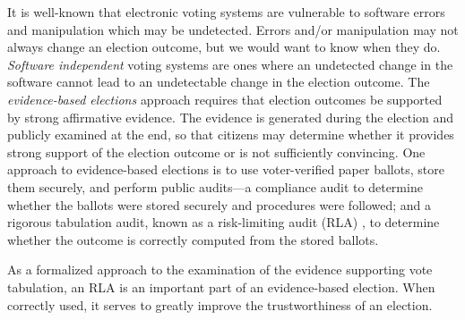 It is well-known that electronic voting systems are vulnerable to software errors and manipulation which may be undetected. Errors and/or manipulation may not always change an election outcome, but we would want to know when they do. {\em Software independent} voting systems \cite{SI-Wack,rivest2008notion} are ones where an undetected change in the software cannot lead to an undetectable change in the election outcome. The {\em evidence-based elections} \cite{evidence-based} approach requires that election outcomes be supported by strong affirmative evidence. The evidence is generated during the election and publicly examined at the end, so that citizens may determine whether it provides strong support of the election outcome or is not sufficiently convincing. 
One approach to evidence-based elections is to use voter-verified paper ballots, store them securely, and perform public audits---a compliance audit to determine whether the ballots were stored securely and procedures were followed; and a rigorous tabulation audit, known as a risk-limiting audit (RLA) \cite{RLA}, to determine whether the outcome is correctly computed from the stored ballots.  

As a formalized approach to the examination of the evidence supporting vote tabulation, an RLA is an important part of an evidence-based election. When correctly used, it serves to greatly improve the trustworthiness of an election. 

